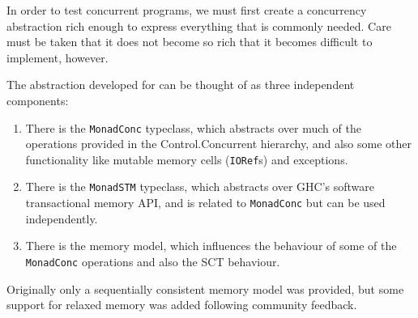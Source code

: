 In order to test concurrent programs, we must first create a
concurrency abstraction rich enough to express everything that is
commonly needed. Care must be taken that it does not become so rich
that it becomes difficult to implement, however.

The abstraction developed for \dejafu{} can be thought of as three
independent components:

\begin{enumerate}
\item There is the \verb|MonadConc| typeclass, which abstracts over
  much of the operations provided in the Control.Concurrent hierarchy,
  and also some other functionality like mutable memory cells
  (\verb|IORef|s) and exceptions.

\item There is the \verb|MonadSTM| typeclass, which abstracts over
  GHC's software transactional memory API, and is related to
  \verb|MonadConc| but can be used independently.

\item There is the memory model, which influences the behaviour of
  some of the \verb|MonadConc| operations and also the SCT behaviour.
\end{enumerate}

Originally only a sequentially consistent memory model was provided,
but some support for relaxed memory was added following community
feedback.
